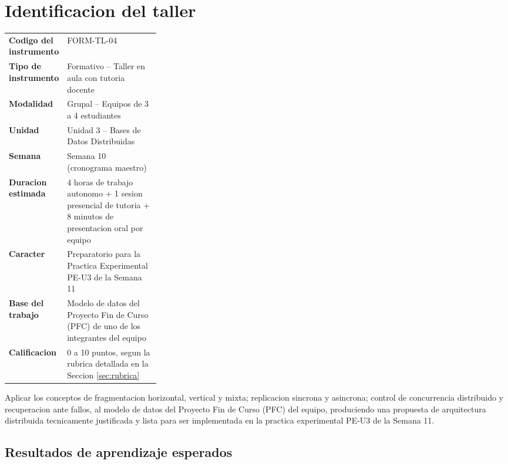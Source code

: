 \documentclass[11pt,a4paper]{article}
\begin{document}
\tableofcontents
\newpage

\section{Identificacion del taller}

\begin{tcolorbox}[enhanced, colback=uteqOff, colframe=uteqBlue, boxrule=0.6pt, arc=2mm]
\renewcommand{\arraystretch}{1.25}
\begin{tabularx}{\linewidth}{@{}p{0.30\linewidth}X@{}}
\textbf{Codigo del instrumento} & FORM-TL-04 \\
\textbf{Tipo de instrumento} & Formativo -- Taller en aula con tutoria docente \\
\textbf{Modalidad} & Grupal -- Equipos de 3 a 4 estudiantes \\
\textbf{Unidad} & Unidad 3 -- Bases de Datos Distribuidas \\
\textbf{Semana} & Semana 10 (cronograma maestro) \\
\textbf{Duracion estimada} & 4 horas de trabajo autonomo + 1 sesion presencial de tutoria + 8 minutos de presentacion oral por equipo \\
\textbf{Caracter} & Preparatorio para la Practica Experimental PE-U3 de la Semana 11 \\
\textbf{Base del trabajo} & Modelo de datos del Proyecto Fin de Curso (PFC) de uno de los integrantes del equipo \\
\textbf{Calificacion} & 0 a 10 puntos, segun la rubrica detallada en la Seccion \ref{sec:rubrica} \\
\end{tabularx}
\end{tcolorbox}

\begin{cajaobjetivo}
Aplicar los conceptos de fragmentacion horizontal, vertical y mixta; replicacion sincrona y asincrona; control de concurrencia distribuido y recuperacion ante fallos, al modelo de datos del Proyecto Fin de Curso (PFC) del equipo, produciendo una propuesta de arquitectura distribuida tecnicamente justificada y lista para ser implementada en la practica experimental PE-U3 de la Semana 11.
\end{cajaobjetivo}

\subsection{Resultados de aprendizaje esperados}
\end{document}
